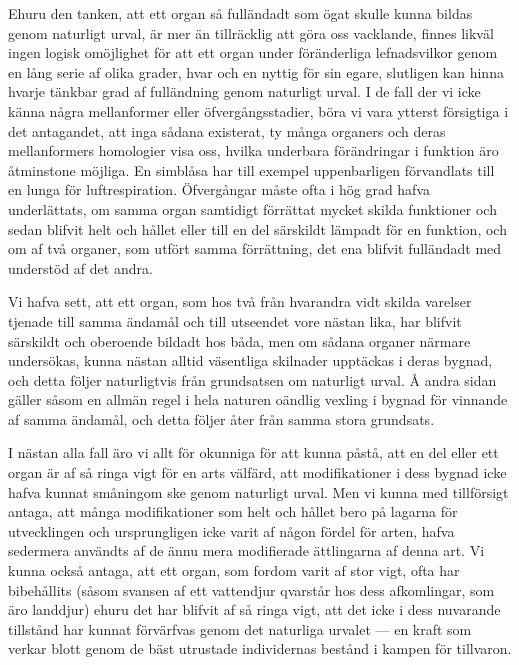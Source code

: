 Ehuru den tanken, att ett organ så fulländadt som ögat skulle kunna bildas genom naturligt urval, är mer än tillräcklig att göra oss vacklande, finnes likväl ingen logisk omöjlighet för att ett organ under föränderliga lefnadsvilkor genom en lång serie af olika grader, hvar och en nyttig för sin egare, slutligen kan hinna hvarje tänkbar grad af fulländning genom naturligt urval. I de fall der vi icke känna några mellanformer eller öfvergångsstadier, böra vi vara ytterst försigtiga i det antagandet, att inga sådana existerat, ty många organers och deras mellanformers homologier visa oss, hvilka underbara förändringar i funktion äro åtminstone möjliga. En simblåsa har till exempel uppenbarligen förvandlats till en lunga för luftrespiration. Öfvergångar måste ofta i hög grad hafva underlättats, om samma organ samtidigt förrättat mycket skilda funktioner och sedan blifvit helt och hållet eller till en del särskildt lämpadt för en funktion, och om af två organer, som utfört samma förrättning, det ena blifvit fulländadt med understöd af det andra.

Vi hafva sett, att ett organ, som hos två från hvarandra vidt skilda varelser tjenade till samma ändamål och till utseendet vore nästan lika, har blifvit särskildt och oberoende bildadt hos båda, men om sådana organer närmare undersökas, kunna nästan alltid väsentliga skilnader upptäckas i deras bygnad, och detta följer naturligtvis från grundsatsen om naturligt urval. Å andra sidan gäller såsom en allmän regel i hela naturen oändlig vexling i bygnad för vinnande af samma ändamål, och detta följer åter från samma stora grundsats.

I nästan alla fall äro vi allt för okunniga för att kunna påstå, att en del eller ett organ är af så ringa vigt för en arts välfärd, att modifikationer i dess bygnad icke hafva kunnat småningom ske genom naturligt urval. Men vi kunna med tillförsigt antaga, att många modifikationer som helt och hållet bero på lagarna för utvecklingen och ursprungligen icke varit af någon fördel för arten, hafva sedermera användts af de ännu mera modifierade ättlingarna af denna art. Vi kunna också antaga, att ett organ, som fordom varit af stor vigt, ofta har bibehållits (såsom svansen af ett vattendjur qvarstår hos dess afkomlingar, som äro landdjur) ehuru det har blifvit af så ringa vigt, att det icke i dess nuvarande tillstånd har kunnat förvärfvas genom det naturliga urvalet — en kraft som verkar blott genom de bäst utrustade individernas bestånd i kampen för tillvaron.

